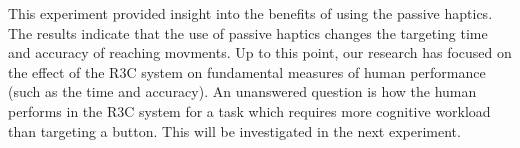 This experiment provided insight into the benefits of using the passive haptics.
The results indicate that the use of passive haptics changes the targeting time and accuracy of reaching movments.
Up to this point, our research has focused on the effect of the R3C system on fundamental measures of human performance (such as the time and accuracy).
An unanswered question is how the human performs in the R3C system for a task which requires more cognitive workload than targeting a button.
This will be investigated in the next experiment.
